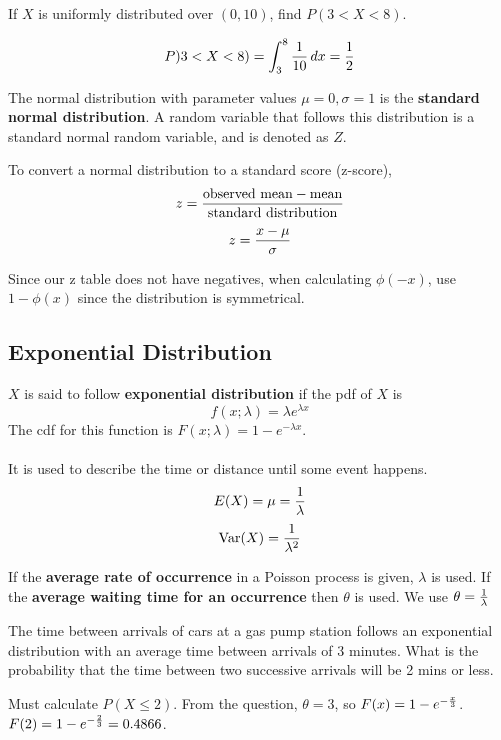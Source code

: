 \documentclass[english, 12pt]{article}
\begin{document}
\begin{exmp}
If $X$ is uniformly distributed over $(0,10)$, find $P(3 < X < 8)$.
\begin{sol}
\[P)3 < X < 8) = \int_3^8 \frac{1}{10}\,dx = \frac{1}{2}\]
\end{sol}
\end{exmp}

\begin{defn}
The normal distribution with parameter values $\mu = 0, \sigma = 1$ is the \textbf{standard normal distribution}. A random variable that follows this distribution is a standard normal random variable, and is denoted as $Z$.
\end{defn}

\begin{note}
To convert a normal distribution to a standard score (z-score),
\[z = \frac{\text{observed mean} - \text{mean}}{\text{standard distribution}}\]
\[z = \frac{x - \mu}{\sigma}\]
\end{note}

\begin{note}
Since our z table does not have negatives, when calculating $\phi(-x)$, use $1 - \phi(x)$ since the distribution is symmetrical.
\end{note}

\subsection{Exponential Distribution}
\begin{defn}
$X$ is said to follow \textbf{exponential distribution} if the pdf of $X$ is
\[f(x;\lambda) = \lambda e^{\lambda x}\]
The cdf for this function is $F(x;\lambda) = 1 - e^{- \lambda x}$. \\\\
It is used to describe the time or distance until some event happens.
\[E(X) = \mu = \frac{1}{\lambda}\]
\[\text{Var}(X) = \frac{1}{\lambda^2}\]

\begin{note}
If the \textbf{average rate of occurrence} in a Poisson process is given, $\lambda$ is used. If the \textbf{average waiting time for an occurrence} then $\theta$ is used. We use $\theta = \frac{1}{\lambda}$
\end{note}
\end{defn}

\begin{exmp}
The time between arrivals of cars at a gas pump station follows an exponential distribution with an average time between arrivals of 3 minutes. What is the probability that the time between two successive arrivals will be 2 mins or less.
\begin{sol}
Must calculate $P(X \leq 2)$. From the question, $\theta = 3$, so $F(x) = 1 - e^{-\frac{x}{3}}$. $F(2) = 1 - e^{-\frac{2}{3}} = 0.4866$.
\end{sol}
\end{exmp}
\end{document}
